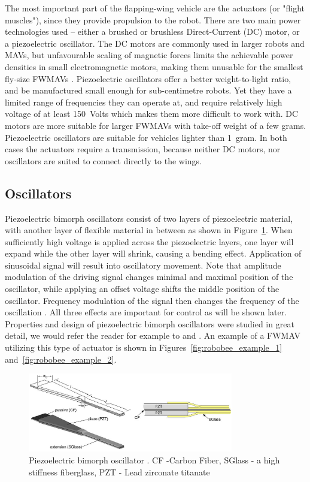 The most important part of the flapping-wing vehicle are the actuators (or "flight muscles"), since they provide propulsion to the robot. There are two main power technologies used -- either a brushed or brushless Direct-Current (DC) motor, or a piezoelectric oscillator. The DC motors are commonly used in larger robots and MAVs, but unfavourable scaling of magnetic forces limits the achievable power densities in small electromagnetic motors, making them unusable for the smallest fly-size FWMAVs \cite{Buck2013} \cite{Fuller2014}. Piezoelectric oscillators offer a better weight-to-light ratio, and be manufactured small enough for sub-centimetre robots. Yet they have a limited range of frequencies they can operate at, and require relatively high voltage of at least 150~Volts \cite{Wood2005} which makes them more difficult to work with. DC motors are more suitable for larger FWMAVs with take-off weight of a few grams. Piezoelectric oscillators are suitable for vehicles lighter than 1~gram. In both cases the actuators require a transmission, because neither DC motors, nor oscillators are suited to connect directly to the wings. 

\subsection{Oscillators}
\label{subsec:oscillators}

Piezoelectric bimorph oscillators consist of two layers of piezoelectric material, with another layer of flexible material in between as shown in Figure~\ref{fig:piezo}. When sufficiently high voltage is applied across the piezoelectric layers, one layer will expand while the other layer will shrink, causing a bending effect. Application of sinusoidal signal will result into oscillatory movement. Note that amplitude modulation of the driving signal changes minimal and maximal position of the oscillator, while applying an offset voltage shifts the middle position of the oscillator. Frequency modulation of the signal then changes the frequency of the oscillation \cite{Chirarattananon}. All three effects are important for control as will be shown later. Properties and design of piezoelectric bimorph oscillators were studied in great detail, we would refer the reader for example to \cite{Karpelson2012} and \cite{Wood2005}. An example of a FWMAV utilizing this type of actuator is shown in Figures~\ref{fig:robobee_example_1} and~\ref{fig:robobee_example_2}.

\begin{figure}
\centering
\includegraphics[width=0.8\textwidth]{Files/Figures/piezo.png}
\caption[Piezoelectric bimorph oscillator]{Piezoelectric bimorph oscillator \cite{Wood2005}. CF -Carbon Fiber, SGlass - a high stiffness fiberglass, PZT - Lead zirconate titanate}
\label{fig:piezo}
\end{figure}

